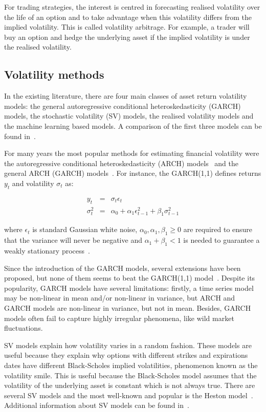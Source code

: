 For trading strategies, the interest is centred in forecasting realised
volatility over the life of an option and to take advantage when this
volatility differs from the implied volatility. This is called volatility
arbitrage. For example, a trader will buy an option and hedge the underlying
asset if the implied volatility is under the realised volatility. 


\subsection{Volatility methods}

In the existing literature, there are four main classes of asset return
volatility models: the general autoregressive conditional heteroskedasticity
(GARCH) models, the stochastic volatility (SV) models, the realised volatility
models and the machine learning based models. A comparison of the first three
models can be found in~\cite{wei2012}. 

For many years the most popular methods for estimating financial volatility were
the autoregressive conditional heteroskedasticity (ARCH) models~\cite{engle1982}
and the general ARCH (GARCH) models~\cite{bollerslev1986}. For instance, the
GARCH(1,1) defines returns $y_t$ and volatility $\sigma_t$ as:

\begin{eqnarray*}
    y_t &=& \sigma_t \epsilon_t \\
     \sigma_t^2 &=& \alpha_0 + \alpha_1 \epsilon_{t-1}^2 + \beta_1
     \sigma_{t-1}^2
\end{eqnarray*}

\noindent where $\epsilon_t$ is standard Gaussian white noise,
$\alpha_0,\alpha_1,\beta_1 \geq 0$ are required to ensure that the
variance will never be negative and $\alpha_1+\beta_1 <1$ is needed to
guarantee a weakly stationary process~\cite{nelson1990}.

Since the introduction of the GARCH models, several extensions have been
proposed, but none of them seems to beat the GARCH(1,1)
model~\cite{lunde+hansen2005}. Despite its popularity, GARCH models have
several limitations: firstly, a time series model may be non-linear in mean
and/or non-linear in variance, but ARCH and GARCH models are non-linear in
variance, but not in mean. Besides, GARCH models often fail to capture highly
irregular phenomena, like wild market fluctuations.  

SV models explain how volatility varies in a random fashion. These models are
useful because they explain why options with different strikes and expirations
dates have different Black-Scholes implied volatilities, phenomenon known as
the volatility smile. This is useful because the Black-Scholes model assumes
that the volatility of the underlying asset is constant which is not always
true. There are several SV models and the most well-known and popular is the
Heston model~\cite{heston1993}. Additional information about SV models can be
found in~\cite{shephard1995}. 


